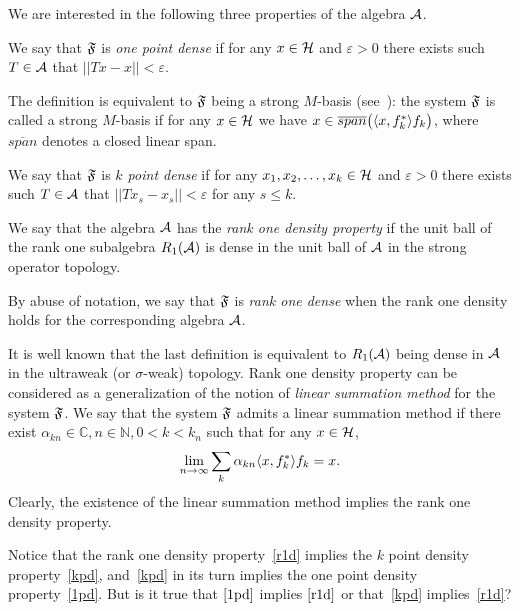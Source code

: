 \documentclass[12pt,oneside,a4paper]{amsart}
\begin{document}
  We are interested in the following three properties of the algebra $\cal{A}$.
  \begin{definition}
    \label{1pd}
    We say that $\fsys$ is \emph{one point dense} if for any $x \in \cal{H}$ and $\varepsilon > 0$
      there exists such $T\in \cal{A}$ that $||Tx - x|| < \varepsilon$.

  \end{definition}
    The definition is equivalent to $\fsys$ being a strong $M$-basis (see~\cite{katavolos}):
    the system $\fsys$ is called a strong $M$-basis if for any $x\in\cal{H}$ we have $x \in \overline{span}\big(\inner{x}{f^*_k}f_k\big)$, where
      $\overline{span}$ denotes a closed linear span.
  \begin{definition}
    \label{kpd}
    We say that $\fsys$ is \emph{$k$ point dense} if for any $x_1, x_2, \dots, x_k \in \cal{H}$ and $\varepsilon > 0$
      there exists such $T\in \cal{A}$ that $||Tx_s - x_s|| < \varepsilon$ for any $s \leq k$.
  \end{definition}
  \begin{definition}
    \label{r1d}
    We say that the algebra $\cal{A}$ has the \emph{rank one density property} if
      the unit ball of the rank one subalgebra $R_1(\cal{A})$ is dense in the unit ball of $\cal{A}$ in the strong operator topology.
  \end{definition}
  By abuse of notation, we say that $\fsys$ is \emph{rank one dense} when the rank one density holds for the corresponding algebra $\cal{A}$.

  It is well known that the last definition is equivalent to $R_1(\cal{A})$ being dense
    in $\cal{A}$ in the ultraweak (or $\sigma$-weak) topology.
  Rank one density property can be considered as a generalization of the notion of \emph{linear summation method} for the system $\fsys$.
  We say that the system $\fsys$ admits a linear summation method if there exist $\alpha_{kn} \in \mathbb{C}, n \in \mathbb{N}, 0 < k < k_n$
    such that for any $x \in \cal{H}$,
    \[
      \lim_{n \to \infty} \sum_k \alpha_{kn} \inner{x}{f^*_k}f_k = x.
    \]
  Clearly, the existence of the linear summation method implies the rank one density property.

  Notice that the rank one density property~\eqref{r1d} implies the $k$ point density property~\eqref{kpd}, and~\eqref{kpd}
    in its turn implies the one point density property~\eqref{1pd}.
  But is it true that $\eqref{1pd}$ implies $\eqref{r1d}$ or that~\eqref{kpd} implies~\eqref{r1d}?
\end{document}
